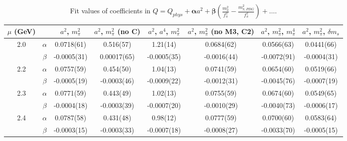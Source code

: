 \documentclass[12pt]{extarticle}
\begin{document}
\begin{table}[h!]
\begin{center}
\begin{tabular}{|c c|c|c|c|c|c|c|}
\hline
$\mu$ (GeV) &  & $a^2$, $m_\pi^2$& $a^2$, $m_\pi^2$ (no C)& $a^2$, $a^4$, $m_\pi^2$& $a^2$, $m_\pi^2$ (no M3, C2)& $a^2$, $m_\pi^2$, $m_\pi^4$& $a^2$, $m_\pi^2$, $\delta m_s$\\
\hline
\multirow{2}{0.5in}{2.0} & $\alpha$ & 0.0718(61)& 0.516(57)& 1.21(14)& 0.0684(62)& 0.0566(63)& 0.0441(66)\\
 & $\beta$ & -0.0005(31)& 0.00017(65)& -0.0005(35)& -0.0016(44)& -0.0072(91)& -0.0004(31)\\
\hline
\multirow{2}{0.5in}{2.2} & $\alpha$ & 0.0757(59)& 0.454(50)& 1.04(13)& 0.0741(59)& 0.0654(60)& 0.0519(66)\\
 & $\beta$ & -0.0005(19)& -0.0003(46)& -0.0009(22)& -0.0012(31)& -0.0045(76)& -0.0007(19)\\
\hline
\multirow{2}{0.5in}{2.3} & $\alpha$ & 0.0771(59)& 0.443(49)& 1.02(13)& 0.0755(59)& 0.0674(60)& 0.0549(65)\\
 & $\beta$ & -0.0004(18)& -0.0003(39)& -0.0007(20)& -0.0010(29)& -0.0040(73)& -0.0006(17)\\
\hline
\multirow{2}{0.5in}{2.4} & $\alpha$ & 0.0787(58)& 0.431(48)& 0.98(12)& 0.0777(59)& 0.0700(60)& 0.0583(64)\\
 & $\beta$ & -0.0003(15)& -0.0003(33)& -0.0007(18)& -0.0008(27)& -0.0033(70)& -0.0005(15)\\
\hline
\end{tabular}
\caption{Fit values of coefficients in $Q = Q_{phys} + \mathbf{\alpha} a^2 + \mathbf{\beta}\left(\frac{m_\pi^2}{f_\pi^2}-\frac{m_{\pi,PDG}^2}{f_\pi^2}\right) + \ldots$.}
\end{center}
\end{table}
























\clearpage
\end{document}
